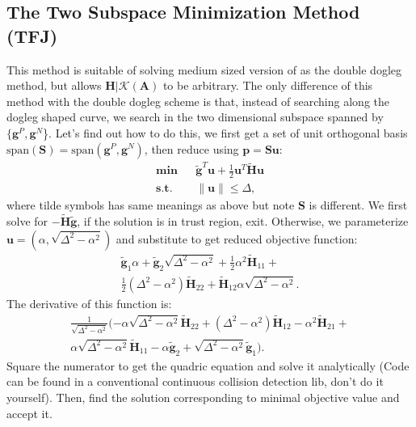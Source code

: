 \documentclass[annual]{acmsiggraph}
\newcommand{\E}[1]{\mathbf{#1}}
\begin{document}
\subsection{The Two Subspace Minimization Method (TFJ)}
This method is suitable of solving medium sized version of  as the double dogleg method, but allows $\E{H}|\mathcal{K}(\E{A})$ to be arbitrary. The only difference of this method with the double dogleg scheme is that, instead of searching along the dogleg shaped curve, we search in the two dimensional subspace spanned by $\{\E{g}^P,\E{g}^N$\}. Let's find out how to do this, we first get a set of unit orthogonal basis $\text{span}(\E{S})=\text{span}(\E{g}^P,\E{g}^N)$, then reduce  using $\E{p}=\E{S}\E{u}$:
\begin{subequations}
\label{pb:TR_PROB_R}
\begin{align}
\E{min}&&\tilde{\E{g}}^T\E{u}+\frac{1}{2}\E{u}^T\tilde{\E{H}}\E{u}	\\
\E{s.t.}&&\|\E{u}\|\leq\Delta,
\end{align}
\end{subequations}
where tilde symbols has same meanings as above but note $\E{S}$ is different. We first solve for $-\tilde{\E{H}}\tilde{\E{g}}$, if the solution is in trust region, exit. Otherwise, we parameterize $\E{u}=(\alpha,\sqrt{\Delta^2-\alpha^2})$ and substitute to get reduced objective function:
\begin{eqnarray*}
\tilde{\E{g}}_1\alpha+\tilde{\E{g}}_2\sqrt{\Delta^2-\alpha^2}+\frac{1}{2}\alpha^2\tilde{\E{H}}_{11}+	\\
\frac{1}{2}(\Delta^2-\alpha^2)\tilde{\E{H}}_{22}+\tilde{\E{H}}_{12}\alpha\sqrt{\Delta^2-\alpha^2}.
\end{eqnarray*}
The derivative of this function is:
\begin{eqnarray*}
\frac{1}{\sqrt{\Delta^2-\alpha^2}}(-\alpha\sqrt{\Delta^2-\alpha^2}\tilde{\E{H}}_{22}+(\Delta^2-\alpha^2)\tilde{\E{H}}_{12}-\alpha^2\tilde{\E{H}}_{21}+	\\
\alpha\sqrt{\Delta^2-\alpha^2}\tilde{\E{H}}_{11}-\alpha\tilde{\E{g}}_2+\sqrt{\Delta^2-\alpha^2}\tilde{\E{g}}_1).
\end{eqnarray*}
Square the numerator to get the quadric equation and solve it analytically (Code can be found in a conventional continuous collision detection lib, don't do it yourself). Then, find the solution corresponding to minimal objective value and accept it.
\end{document}
